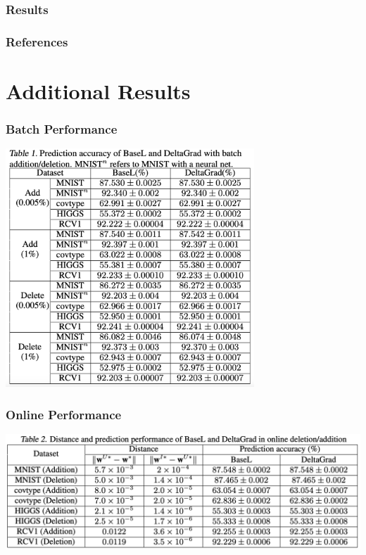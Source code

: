 \documentclass[pdf]{beamer}
\begin{document}
\begin{frame}
  \frametitle{Results}
  
\end{frame}

\begin{frame}[allowframebreaks]
  \frametitle{References}
  
  
\end{frame}

\appendix

\section{Additional Results}
\begin{frame}
  \frametitle{Batch Performance}
  \begin{center}
    \includegraphics[width=0.7\textwidth]{images/Batch results.png}
  \end{center}
\end{frame}

\begin{frame}
  \frametitle{Online Performance}
  \begin{center}
    \includegraphics[width=\textwidth]{images/Online Results.png}
  \end{center}
\end{frame}
\end{document}
